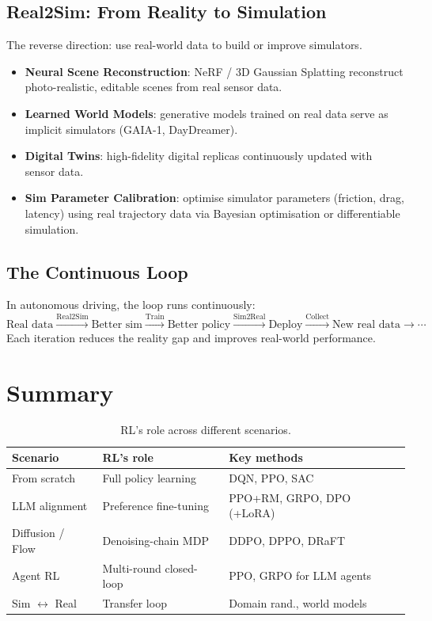 \subsection{Real2Sim: From Reality to Simulation}

The reverse direction: use real-world data to build or improve simulators.

\begin{itemize}
  \item \textbf{Neural Scene Reconstruction}: NeRF / 3D Gaussian Splatting reconstruct photo-realistic, editable scenes from real sensor data.
  \item \textbf{Learned World Models}: generative models trained on real data serve as implicit simulators (GAIA-1, DayDreamer).
  \item \textbf{Digital Twins}: high-fidelity digital replicas continuously updated with sensor data.
  \item \textbf{Sim Parameter Calibration}: optimise simulator parameters (friction, drag, latency) using real trajectory data via Bayesian optimisation or differentiable simulation.
\end{itemize}

\subsection{The Continuous Loop}

In autonomous driving, the loop runs continuously:
\[
  \text{Real data} \xrightarrow{\text{Real2Sim}} \text{Better sim}
  \xrightarrow{\text{Train}} \text{Better policy}
  \xrightarrow{\text{Sim2Real}} \text{Deploy}
  \xrightarrow{\text{Collect}} \text{New real data}
  \to \cdots
\]
Each iteration reduces the reality gap and improves real-world performance.

\section{Summary}

\begin{table}[htbp]
\centering
\caption{RL's role across different scenarios.}
\begin{tabular}{@{}lll@{}}
\toprule
\textbf{Scenario} & \textbf{RL's role} & \textbf{Key methods} \\
\midrule
From scratch & Full policy learning & DQN, PPO, SAC \\
LLM alignment & Preference fine-tuning & PPO+RM, GRPO, DPO (+LoRA) \\
Diffusion / Flow & Denoising-chain MDP & DDPO, DPPO, DRaFT \\
Agent RL & Multi-round closed-loop & PPO, GRPO for LLM agents \\
Sim $\leftrightarrow$ Real & Transfer loop & Domain rand., world models \\
\bottomrule
\end{tabular}
\end{table}


